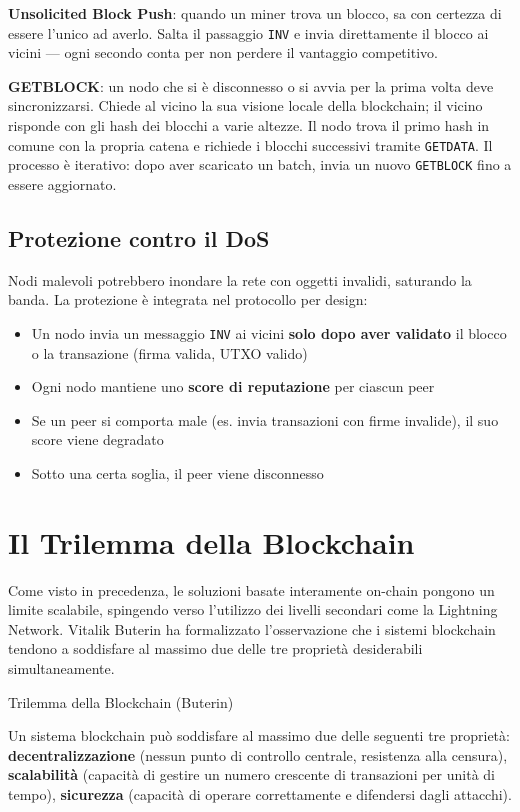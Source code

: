 \documentclass[
  italian,
  openany]{book}
\providecommand{\tightlist}{%
  \setlength{\itemsep}{0pt}\setlength{\parskip}{0pt}}
\begin{document}
\textbf{Unsolicited Block Push}: quando un miner trova un blocco, sa con
certezza di essere l'unico ad averlo. Salta il passaggio \texttt{INV} e
invia direttamente il blocco ai vicini --- ogni secondo conta per non
perdere il vantaggio competitivo.

\textbf{GETBLOCK}: un nodo che si è disconnesso o si avvia per la prima
volta deve sincronizzarsi. Chiede al vicino la sua visione locale della
blockchain; il vicino risponde con gli hash dei blocchi a varie altezze.
Il nodo trova il primo hash in comune con la propria catena e richiede i
blocchi successivi tramite \texttt{GETDATA}. Il processo è iterativo:
dopo aver scaricato un batch, invia un nuovo \texttt{GETBLOCK} fino a
essere aggiornato.

\subsection{Protezione contro il DoS}\label{protezione-contro-il-dos}

Nodi malevoli potrebbero inondare la rete con oggetti invalidi,
saturando la banda. La protezione è integrata nel protocollo per design:

\begin{itemize}
\tightlist
\item
  Un nodo invia un messaggio \texttt{INV} ai vicini \textbf{solo dopo
  aver validato} il blocco o la transazione (firma valida, UTXO valido)
\item
  Ogni nodo mantiene uno \textbf{score di reputazione} per ciascun peer
\item
  Se un peer si comporta male (es. invia transazioni con firme
  invalide), il suo score viene degradato
\item
  Sotto una certa soglia, il peer viene disconnesso
\end{itemize}

\section{Il Trilemma della
Blockchain}\label{il-trilemma-della-blockchain}

Come visto in precedenza, le soluzioni basate interamente on-chain
pongono un limite scalabile, spingendo verso l'utilizzo dei livelli
secondari come la Lightning Network. Vitalik Buterin ha formalizzato
l'osservazione che i sistemi blockchain tendono a soddisfare al massimo
due delle tre proprietà desiderabili simultaneamente.

\begin{calloutdefinition}{Trilemma della Blockchain (Buterin)}

Un sistema blockchain può soddisfare al massimo due delle seguenti tre
proprietà: \textbf{decentralizzazione} (nessun punto di controllo
centrale, resistenza alla censura), \textbf{scalabilità} (capacità di
gestire un numero crescente di transazioni per unità di tempo),
\textbf{sicurezza} (capacità di operare correttamente e difendersi dagli
attacchi).

\end{calloutdefinition}
\end{document}
